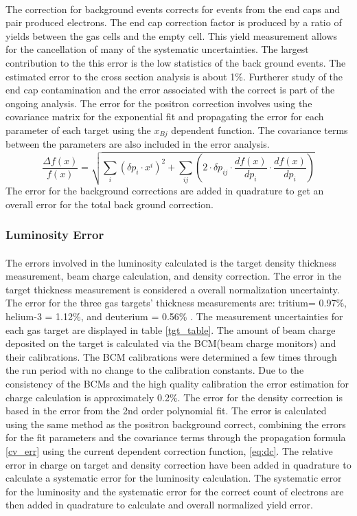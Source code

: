\paragraph{}The correction for background events corrects for events from the end caps and pair produced electrons. The end cap correction factor is produced by a ratio of yields between the gas cells and the empty cell. This yield measurement allows for the cancellation of many of the systematic uncertainties. The largest contribution to the this error is the low statistics of the back ground events. The estimated error to the cross section analysis is about 1\%. Furtherer study of the end cap contamination and the error associated with the correct is part of the ongoing analysis. The error for the positron correction involves using the covariance matrix for the exponential fit and propagating the error for each parameter of each target using the $x_{Bj}$ dependent function. The covariance terms between the parameters are also included in the error analysis.
\begin{equation}
\frac{\Delta f(x)}{f(x)} =  \sqrt{ \sum_{i}^{} \left(\delta p_i\cdot x^i\right)^2 + \sum_{ij}^{}\left( 2\cdot \delta p_{ij}\cdot \dfrac{df(x)}{dp_i}\cdot \dfrac{df(x)}{dp_i}\right) } \label{cv_err}
\end{equation}
The error for the background corrections are added in quadrature to get an overall error for the total back ground correction.  
\subsubsection{Luminosity Error}
\paragraph{}The errors involved in the luminosity calculated is the target density thickness measurement, beam charge calculation, and density correction. The error in the target thickness measurement is considered a overall normalization uncertainty. The error for the three gas targets' thickness measurements are: tritium= 0.97\%, helium-3 = 1.12\%, and deuterium = 0.56\% \cite{HATT_eng}. The measurement uncertainties for each gas target are displayed in table \ref{tgt_table}. The amount of beam charge deposited on the target is calculated via the BCM(beam charge monitors) and their calibrations. The BCM calibrations were determined a few times through the run period with no change to the calibration constants. Due to the consistency of the BCMs and the high quality calibration the  error estimation for charge calculation is approximately 0.2\%. The error for the density correction is based in the error from the 2nd order polynomial fit. The error is calculated using the same method as the positron background correct, combining the errors for the fit parameters and the covariance terms through the propagation formula \ref{cv_err} using the current dependent correction function, \ref{eq:dc}. The relative error in charge on target and density correction have been added in quadrature to calculate a systematic error for the luminosity calculation. The systematic error for the luminosity and the systematic error for the correct count of electrons are then added in quadrature to calculate and overall normalized yield error.  
